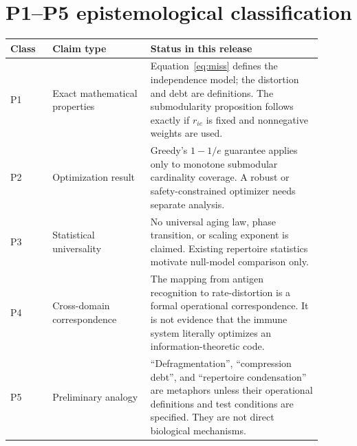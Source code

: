 \documentclass[11pt]{article}
\begin{document}
\section{P1--P5 epistemological classification}
\begin{longtable}{>{\raggedright\arraybackslash}p{0.12\linewidth}p{0.29\linewidth}p{0.49\linewidth}}
\toprule
Class & Claim type & Status in this release\\
\midrule
P1 & Exact mathematical properties & Equation~\eqref{eq:miss} defines the independence model; the distortion and debt are definitions. The submodularity proposition follows exactly if $r_{ie}$ is fixed and nonnegative weights are used.\\
P2 & Optimization result & Greedy's $1-1/e$ guarantee applies only to monotone submodular cardinality coverage. A robust or safety-constrained optimizer needs separate analysis.\\
P3 & Statistical universality & No universal aging law, phase transition, or scaling exponent is claimed. Existing repertoire statistics motivate null-model comparison only.\\
P4 & Cross-domain correspondence & The mapping from antigen recognition to rate-distortion is a formal operational correspondence. It is not evidence that the immune system literally optimizes an information-theoretic code.\\
P5 & Preliminary analogy & ``Defragmentation'', ``compression debt'', and ``repertoire condensation'' are metaphors unless their operational definitions and test conditions are specified. They are not direct biological mechanisms.\\
\bottomrule
\end{longtable}
\end{document}
